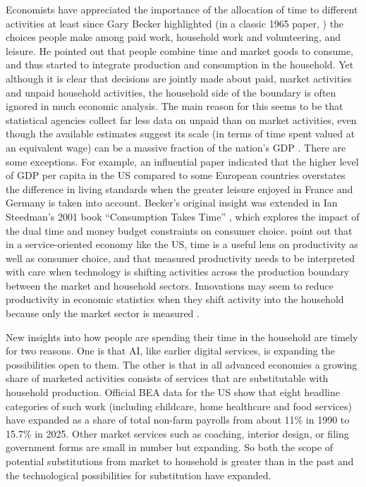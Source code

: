\documentclass[11pt,a4paper]{article}
\begin{document}
Economists have appreciated the importance of the allocation of time to different activities at least since Gary Becker highlighted (in a classic 1965 paper, \cite{becker1965}) the choices people make among paid work, household work and volunteering, and leisure. He pointed out that people combine time and market goods to consume, and thus started to integrate production and consumption in the household. Yet although it is clear that decisions are jointly made about paid, market activities and unpaid household activities, the household side of the boundary is often ignored in much economic analysis. The main reason for this seems to be that statistical agencies collect far less data on unpaid than on market activities, even though the available estimates suggest its scale (in terms of time spent valued at an equivalent wage) can be a massive fraction of the nation’s GDP \citep[e.g.,][]{bridgman2012accounting}. There are some exceptions. For example, an influential paper \citep{Jones2016} indicated that the higher level of GDP per capita in the US compared to some European countries overstates the difference in living standards when the greater leisure enjoyed in France and Germany is taken into account. Becker’s original insight was extended in Ian Steedman’s 2001 book ``Consumption Takes Time'' \citep{Steedman2001}, which explores the impact of the dual time and money budget constraints on consumer choice. \citet{https://doi.org/10.17863/cam.84770} point out that in a service-oriented economy like the US, time is a useful lens on productivity as well as consumer choice, and that measured productivity needs to be interpreted with care when technology is shifting activities across the production boundary between the market and household sectors. Innovations may seem to reduce productivity in economic statistics when they shift activity into the household because only the market sector is measured \citep{Coyle2018}.

New insights into how people are spending their time in the household are timely for two reasons. One is that AI, like earlier digital services, is expanding the possibilities open to them. The other is that in all advanced economies a growing share of marketed activities consists of services that are substitutable with household production. Official BEA data for the US show that eight headline categories of such work (including childcare, home healthcare and food services) have expanded as a share of total non-farm payrolls from about 11\% in 1990 to 15.7\% in 2025. Other market services such as coaching, interior design, or filing government forms are small in number but expanding. So both the scope of potential substitutions from market to household is greater than in the past and the technological possibilities for substitution have expanded.
\end{document}
